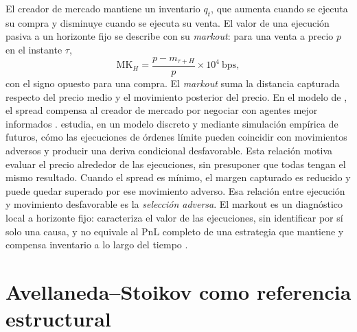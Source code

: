 El creador de mercado mantiene un inventario $q_t$, que aumenta cuando se ejecuta su compra y disminuye cuando se ejecuta su venta. El valor de una ejecución pasiva a un horizonte fijo se describe con su \textit{markout}: para una venta a precio $p$ en el instante $\tau$,
\begin{equation}
 \mathrm{MK}_H=\frac{p-m_{\tau+H}}{p}\times10^4~\text{bps},
 \label{eq:markout}
\end{equation}
con el signo opuesto para una compra. El \textit{markout} suma la distancia capturada respecto del precio medio y el movimiento posterior del precio. En el modelo de \citet{GlostenMilgrom1985}, el spread compensa al creador de mercado por negociar con agentes mejor informados \citep{OHara1995}. \citet{DeLise2024} estudia, en un modelo discreto y mediante simulación empírica de futuros, cómo las ejecuciones de órdenes límite pueden coincidir con movimientos adversos y producir una deriva condicional desfavorable. Esta relación motiva evaluar el precio alrededor de las ejecuciones, sin presuponer que todas tengan el mismo resultado. Cuando el spread es mínimo, el margen capturado es reducido y puede quedar superado por ese movimiento adverso. Esa relación entre ejecución y movimiento desfavorable es la \emph{selección adversa}. El markout es un diagnóstico local a horizonte fijo: caracteriza el valor de las ejecuciones, sin identificar por sí solo una causa, y no equivale al PnL completo de una estrategia que mantiene y compensa inventario a lo largo del tiempo \citep{Menkveld2013}.

\section{Avellaneda--Stoikov como referencia estructural}


